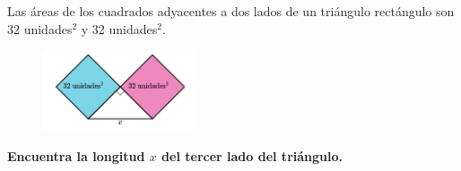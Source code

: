 Las áreas de los cuadrados adyacentes a dos lados de un triángulo rectángulo son 32 unidades$^2$ y 32 unidades$^2$.
\begin{figure}[H]
    \begin{center}
        \includegraphics[width=0.4\textwidth]{../images/area1.png}
    \end{center}
    \caption{}
    \label{fig:area1}
\end{figure}
\textbf{Encuentra la longitud $x$ del tercer lado del triángulo.}
